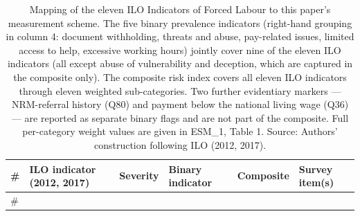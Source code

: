 \documentclass[
  12pt,
  letterpaper,
  DIV=11,
  numbers=noendperiod]{scrartcl}
\begin{document}
\begin{longtable}[]{@{}
  >{\raggedleft\arraybackslash}p{}
  >{\raggedright\arraybackslash}p{}
  >{\centering\arraybackslash}p{}
  >{\raggedright\arraybackslash}p{}
  >{\centering\arraybackslash}p{}
  >{\raggedright\arraybackslash}p{}@{}}
\caption{Mapping of the eleven ILO Indicators of Forced Labour to this
paper's measurement scheme. The five binary prevalence indicators
(right-hand grouping in column 4: document withholding, threats and
abuse, pay-related issues, limited access to help, excessive working
hours) jointly cover nine of the eleven ILO indicators (all except abuse
of vulnerability and deception, which are captured in the composite
only). The composite risk index covers all eleven ILO indicators through
eleven weighted sub-categories. Two further evidentiary markers ---
NRM-referral history (Q80) and payment below the national living wage
(Q36) --- are reported as separate binary flags and are not part of the
composite. Full per-category weight values are given in ESM\_1, Table 1.
Source: Authors' construction following ILO (2012,
2017).}\tabularnewline
\toprule\noalign{}
\begin{minipage}[b]{\linewidth}\raggedleft
\#
\end{minipage} & \begin{minipage}[b]{\linewidth}\raggedright
ILO indicator (2012, 2017)
\end{minipage} & \begin{minipage}[b]{\linewidth}\centering
Severity
\end{minipage} & \begin{minipage}[b]{\linewidth}\raggedright
Binary indicator
\end{minipage} & \begin{minipage}[b]{\linewidth}\centering
Composite
\end{minipage} & \begin{minipage}[b]{\linewidth}\raggedright
Survey item(s)
\end{minipage} \\
\midrule\noalign{}
\endfirsthead
\toprule\noalign{}
\begin{minipage}[b]{\linewidth}\raggedleft
\#
\end{minipage} & \begin{minipage}[b]{\linewidth}\raggedright

\end{minipage}
\end{longtable}
\end{document}
